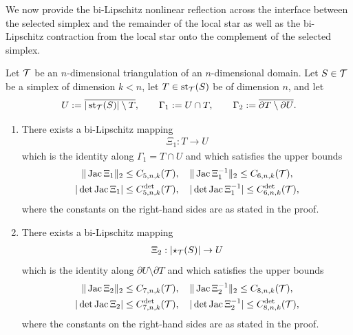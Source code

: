 \documentclass[10pt,letterpaper]{article}
\begin{document}
We now provide the bi-Lipschitz nonlinear reflection across the interface between the selected simplex and the remainder of the local star
as well as the bi-Lipschitz contraction from the local star onto the complement of the selected simplex. 

\begin{proposition}\label{proposition:starreflection}
    Let ${\mathcal T}$ be an $n$-dimensional triangulation of an $n$-dimensional domain. 
    Let $S \in {\mathcal T}$ be a simplex of dimension $k < n$,
    let $T \in \operatorname{st}_{{\mathcal T}}(S)$ be of dimension $n$,
    and let 
    \begin{align*}
        U := \overline{ |\operatorname{st}_{{\mathcal T}}(S)| \setminus T },
        \qquad 
        {\Gamma_1} := U \cap T,
        \qquad 
        {\Gamma_2} := \overline{ \partial T \setminus \partial U }.
    \end{align*}
    \begin{enumerate}
    \item 
    There exists a bi-Lipschitz mapping
    \begin{align*}
        \Xi_{1} : T \rightarrow U
    \end{align*}
    which is the identity along ${\Gamma_1} = T \cap U$ and which satisfies the upper bounds 
    \begin{gather*}
        \|  \operatorname{{\rm Jac}}\Xi_{1}  \|_{2}          \leq C_{5,n,k}({\mathcal T}),
        \quad 
        \|  \operatorname{{\rm Jac}}\Xi_{1}^{-1}  \|_{2}     \leq C_{6,n,k}({\mathcal T}),
        \\
        | \det\operatorname{{\rm Jac}}\Xi_{1} |      \leq C^{\det}_{5,n,k}({\mathcal T}),
        \quad 
        | \det\operatorname{{\rm Jac}}\Xi_{1}^{-1} | \leq C^{\det}_{6,n,k}({\mathcal T}),
    \end{gather*}
    where the constants on the right-hand sides are as stated in the proof. 
    \item 
    There exists a bi-Lipschitz mapping
    \begin{align*}
        \Xi_{2} : \left| \star_{{\mathcal T}}(S) \right| \rightarrow U
    \end{align*}
    which is the identity along $\partial U \setminus \partial T$ and which satisfies the upper bounds 
    \begin{gather*}
        \|  \operatorname{{\rm Jac}}\Xi_{2}  \|_{2}          \leq C_{7,n,k}({\mathcal T}),
        \quad 
        \|  \operatorname{{\rm Jac}}\Xi_{2}^{-1}  \|_{2}     \leq C_{8,n,k}({\mathcal T}),
        \\
        | \det\operatorname{{\rm Jac}}\Xi_{2} |      \leq C^{\det}_{7,n,k}({\mathcal T}),
        \quad 
        | \det\operatorname{{\rm Jac}}\Xi_{2}^{-1} | \leq C^{\det}_{8,n,k}({\mathcal T}),
    \end{gather*}
    where the constants on the right-hand sides are as stated in the proof. 
    \end{enumerate}
\end{proposition}
\end{document}
